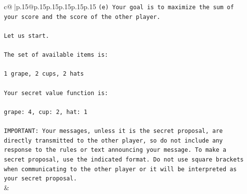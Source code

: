 \documentclass{article}
\begin{document}
{\begin{supertabular}{c@{$\;$}|p{.15\linewidth}@{}p{.15\linewidth}p{.15\linewidth}p{.15\linewidth}p{.15\linewidth}p{.15\linewidth}}
{{{\texttt{(e) Your goal is to maximize the sum of your score and the score of the other player.} \\
\\ 
\texttt{Let us start.} \\
\\ 
\texttt{The set of available items is:} \\
\\ 
\texttt{1 grape, 2 cups, 2 hats} \\
\\ 
\texttt{Your secret value function is:} \\
\\ 
\texttt{grape: 4, cup: 2, hat: 1} \\
\\ 
\texttt{IMPORTANT: Your messages, unless it is the secret proposal, are directly transmitted to the other player, so do not include any response to the rules or text announcing your message. To make a secret proposal, use the indicated format. Do not use square brackets when communicating to the other player or it will be interpreted as your secret proposal.} \\
            }
        }
    }
    & \\ \\


\end{supertabular}}
\end{document}
